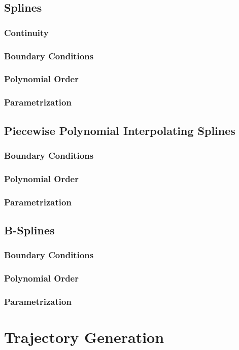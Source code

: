 \subsection{Splines}
\subsubsection{Continuity}
\subsubsection{Boundary Conditions}
\subsubsection{Polynomial Order}
\subsubsection{Parametrization}
\subsection{Piecewise Polynomial Interpolating Splines}
\subsubsection{Boundary Conditions}
\subsubsection{Polynomial Order}
\subsubsection{Parametrization}
\subsection{B-Splines}
\subsubsection{Boundary Conditions}
\subsubsection{Polynomial Order}
\subsubsection{Parametrization}

\section{Trajectory Generation}
\label{sec:trajectoryGeneration}
